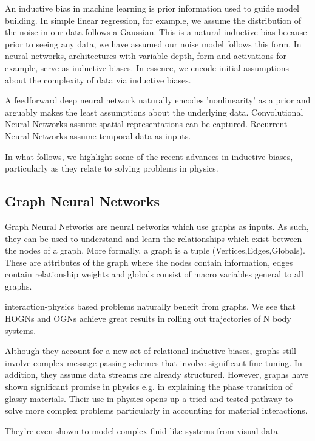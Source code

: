\documentclass{article}
\begin{document}
An inductive bias in machine learning is prior information used to guide model building. In simple linear regression, for example, we assume the distribution of the noise in our data follows a Gaussian. This is a natural inductive bias because prior to seeing any data, we have assumed our noise model follows this form. In neural networks, architectures with variable depth, form and activations for example, serve as inductive biases. In essence, we encode initial assumptions about the complexity of data via inductive biases. 

A feedforward deep neural network naturally encodes 'nonlinearity' as a prior and arguably makes the least assumptions about the underlying data. Convolutional Neural Networks assume spatial representations can be captured. Recurrent Neural Networks assume temporal data as inputs. 

In what follows, we highlight some of the recent advances in inductive biases, particularly as they relate to solving problems in physics.

\subsection{Graph Neural Networks}

Graph Neural Networks are neural networks which use graphs as inputs. As such, they can be used to understand and learn the relationships which exist between the nodes of a graph. More formally, a graph is a tuple (Vertices,Edges,Globals). These are attributes of the graph where the nodes contain information, edges contain relationship weights and globals consist of macro variables general to all graphs. 

interaction-physics based problems naturally benefit from graphs. We see that HOGNs and OGNs achieve great results in rolling out trajectories of N body systems. 

Although they account for a new set of relational inductive biases, graphs still involve complex message passing schemes that involve significant fine-tuning. In addition, they assume data streams are already structured. However, graphs have shown significant promise in physics e.g. in explaining the phase transition of glassy materials. Their use in physics opens up a tried-and-tested pathway to solve more complex problems particularly in accounting for material interactions. 

They're even shown to model complex fluid like systems from visual data. 
\end{document}
